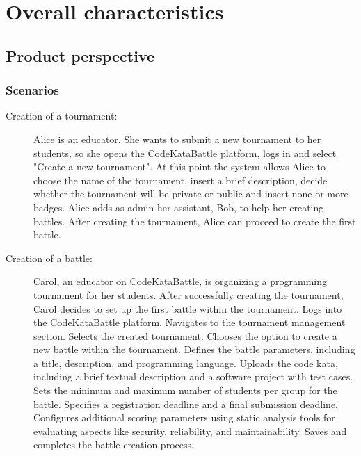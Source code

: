 \documentclass{article}
\begin{document}
\section{Overall characteristics}
        \subsection{Product perspective}
            \subsubsection{Scenarios}
                \begin{description}
                    \item [Creation of a tournament:]
                    
                     Alice is an educator.
                     She wants to submit a new tournament to her students, so she opens the CodeKataBattle platform, logs in and select "Create a new tournament". At this point the system allows Alice to choose the name of the tournament, insert a brief description, decide whether the tournament will be private or public and insert none or more badges.
                     Alice adds as admin her assistant, Bob, to help her creating battles.
                     After creating the tournament, Alice can proceed to create the first battle.

                     \item [Creation of a battle:]

                        Carol, an educator on CodeKataBattle, is organizing a programming tournament for her students. After successfully creating the tournament, Carol decides to set up the first battle within the tournament.
                        Logs into the CodeKataBattle platform.
                        Navigates to the tournament management section.
                        Selects the created tournament.
                        Chooses the option to create a new battle within the tournament.
                        Defines the battle parameters, including a title, description, and programming language.
                        Uploads the code kata, including a brief textual description and a software project with test cases.
                        Sets the minimum and maximum number of students per group for the battle.
                        Specifies a registration deadline and a final submission deadline.
                        Configures additional scoring parameters using static analysis tools for evaluating aspects like security, reliability, and maintainability.
                        Saves and completes the battle creation process.


\end{description}
\end{document}
